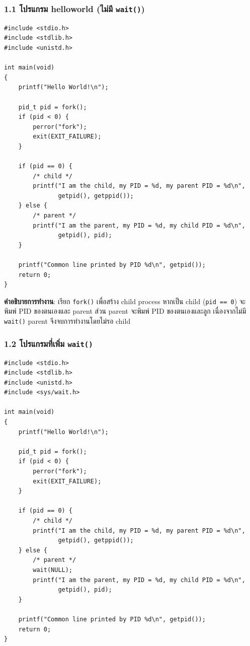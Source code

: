 \documentclass[a4paper,12pt]{article}
\newcommand{\code}[1]{\texttt{#1}}
\begin{document}
\subsubsection{1.1 โปรแกรม helloworld (ไม่มี \code{wait()})}

\begin{lstlisting}[caption={q1\_1\_helloworld.c -- fork() without wait()},label={lst:q1_1}]
#include <stdio.h>
#include <stdlib.h>
#include <unistd.h>

int main(void)
{
    printf("Hello World!\n");

    pid_t pid = fork();
    if (pid < 0) {
        perror("fork");
        exit(EXIT_FAILURE);
    }

    if (pid == 0) {
        /* child */
        printf("I am the child, my PID = %d, my parent PID = %d\n",
               getpid(), getppid());
    } else {
        /* parent */
        printf("I am the parent, my PID = %d, my child PID = %d\n",
               getpid(), pid);
    }

    printf("Common line printed by PID %d\n", getpid());
    return 0;
}
\end{lstlisting}

\textbf{คำอธิบายการทำงาน}: เรียก \code{fork()} เพื่อสร้าง child process หากเป็น child (\code{pid == 0}) จะพิมพ์ PID ของตนเองและ parent ส่วน parent จะพิมพ์ PID ของตนเองและลูก เนื่องจากไม่มี \code{wait()} parent จึงจบการทำงานโดยไม่รอ child

\newpage

\subsubsection{1.2 โปรแกรมที่เพิ่ม \code{wait()}}

\begin{lstlisting}[caption={q1\_2\_wait.c -- fork() with wait()},label={lst:q1_2}]
#include <stdio.h>
#include <stdlib.h>
#include <unistd.h>
#include <sys/wait.h>

int main(void)
{
    printf("Hello World!\n");

    pid_t pid = fork();
    if (pid < 0) {
        perror("fork");
        exit(EXIT_FAILURE);
    }

    if (pid == 0) {
        /* child */
        printf("I am the child, my PID = %d, my parent PID = %d\n",
               getpid(), getppid());
    } else {
        /* parent */
        wait(NULL);
        printf("I am the parent, my PID = %d, my child PID = %d\n",
               getpid(), pid);
    }

    printf("Common line printed by PID %d\n", getpid());
    return 0;
}
\end{lstlisting}
\end{document}
